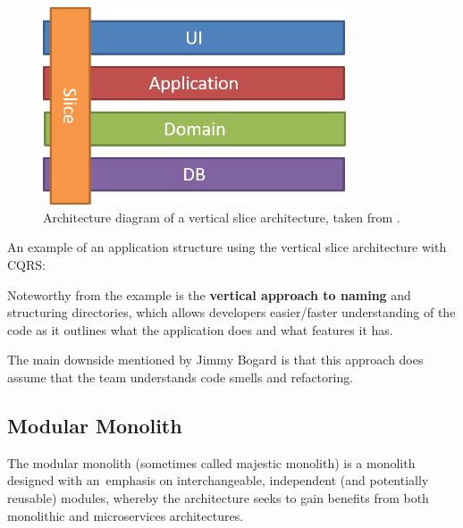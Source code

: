 \begin{figure} [H]
    \centering
    \includegraphics[width=0.8\textwidth]{figures/vertical-slice-architecture.png}
    \caption{Architecture diagram of a vertical slice architecture, taken from \cite{jimmy_bogard:vertical_slice_architecture}.}
    \label{fig:arch:vertical_slice_architecture}
\end{figure}

An example of an application structure using the vertical slice architecture with CQRS: \vspace{6pt}


Noteworthy from the example is the \textbf{vertical approach to naming} and structuring  directories, which allows developers easier/faster understanding of the code as it outlines what the application does and what features it has.

The main downside mentioned by Jimmy Bogard \cite{jimmy_bogard:vertical_slice_architecture} is that this approach does assume that the team understands code smells and refactoring. 

\subsection{Modular Monolith}
\label{theory:modular_monolith}
The modular monolith (sometimes called majestic monolith) is a monolith designed with an~emphasis on interchangeable, independent (and potentially reusable) modules, whereby the architecture seeks to gain benefits from both monolithic and microservices architectures. 

